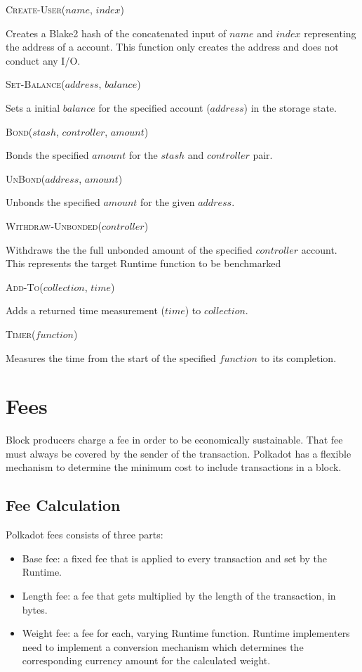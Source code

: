 \documentclass[11pt,a4paper]{article}
\newcommand{\SubItem}[1]{
    {\setlength\itemindent{15pt} \item[-] #1}
}
\begin{document}
\begin{itemize}
  \item \textsc{Create-User($name$, $index$)}
    \SubItem{Creates a Blake2 hash of the concatenated input of $name$ and $index$ representing
    the address of a account. This function only creates the address and does not conduct any I/O.}
  \item \textsc{Set-Balance($address$, $balance$)}
      \SubItem{Sets a initial $balance$ for the specified account ($address$) in the storage state.}
  \item \textsc{Bond($stash$, $controller$, $amount$)}
    \SubItem{Bonds the specified $amount$ for the $stash$ and $controller$ pair.}
  \item \textsc{UnBond($address$, $amount$)}
    \SubItem{Unbonds the specified $amount$ for the given $address$.}
  \item \textsc{Withdraw-Unbonded($controller$)}
    \SubItem{Withdraws the the full unbonded amount of the specified $controller$ account.
    This represents the target Runtime function to be benchmarked}
  \item \textsc{Add-To($collection$, $time$)}
    \SubItem{Adds a returned time measurement ($time$) to $collection$.}
  \item \textsc{Timer($function$)}
    \SubItem{Measures the time from the start of the specified $function$ to its completion.}
\end{itemize}

\section{Fees}
Block producers charge a fee in order to be economically sustainable. That fee must always
be covered by the sender of the transaction. Polkadot has a flexible mechanism to determine
the minimum cost to include transactions in a block.

\subsection{Fee Calculation}
Polkadot fees consists of three parts:

\begin{itemize}
\item Base fee: a fixed fee that is applied to every transaction and set by the Runtime.
\item Length fee: a fee that gets multiplied by the length of the transaction, in bytes.
\item Weight fee: a fee for each, varying Runtime function. Runtime implementers need to
      implement a conversion mechanism which determines the corresponding currency amount
      for the calculated weight.
\end{itemize}
\end{document}
